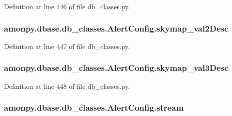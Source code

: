 Definition at line 446 of file db\-\_\-classes.\-py.

\hypertarget{classamonpy_1_1dbase_1_1db__classes_1_1_alert_config_ad123a3f944545c402b09637d5fd3068a}{
\subsubsection[{skymap\-\_\-val2\-Desc}]{\setlength{\rightskip}{0pt plus 5cm}amonpy.\-dbase.\-db\-\_\-classes.\-Alert\-Config.\-skymap\-\_\-val2\-Desc}}\label{classamonpy_1_1dbase_1_1db__classes_1_1_alert_config_ad123a3f944545c402b09637d5fd3068a}


Definition at line 447 of file db\-\_\-classes.\-py.

\hypertarget{classamonpy_1_1dbase_1_1db__classes_1_1_alert_config_a5150e8d288983b9436a2d356c33537cc}{
\subsubsection[{skymap\-\_\-val3\-Desc}]{\setlength{\rightskip}{0pt plus 5cm}amonpy.\-dbase.\-db\-\_\-classes.\-Alert\-Config.\-skymap\-\_\-val3\-Desc}}\label{classamonpy_1_1dbase_1_1db__classes_1_1_alert_config_a5150e8d288983b9436a2d356c33537cc}


Definition at line 448 of file db\-\_\-classes.\-py.

\hypertarget{classamonpy_1_1dbase_1_1db__classes_1_1_alert_config_a5181b25cd2b3960297851cac7538eeb5}{
\subsubsection[{stream}]{\setlength{\rightskip}{0pt plus 5cm}amonpy.\-dbase.\-db\-\_\-classes.\-Alert\-Config.\-stream}}\label{classamonpy_1_1dbase_1_1db__classes_1_1_alert_config_a5181b25cd2b3960297851cac7538eeb5}



